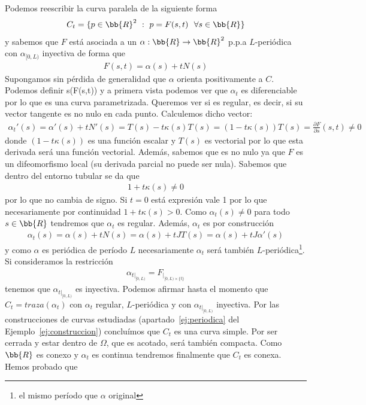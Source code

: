 \begin{ejercicio}
    \begin{solucion}
        Podemos reescribir la curva paralela de la siguiente forma
        \begin{gather*}
            C_t = \{p\in \bb{R}^2 \ : \ p=F(s, t) \ \ \forall s \in \bb{R}\}
        \end{gather*}
        y sabemos que $F$ está asociada a un $\alpha:\bb{R} \to \bb{R}^2$ p.p.a $L$-periódica con $\alpha_{[0,L)}$ inyectiva de forma que 
        \begin{gather*}
            F(s,t) = \alpha(s) + tN(s)
        \end{gather*}
        Supongamos sin pérdida de generalidad que $\alpha$ orienta positivamente a $C$. Podemos definir
             {s}{(F(s,t))}
        y a primera vista podemos ver que $\alpha_t$ es diferenciable por lo que es una curva parametrizada. Queremos ver si es regular, es decir, si su vector tangente es no nulo en cada punto. Calculemos dicho vector:
        \begin{gather*}
            \alpha_t'(s) = \alpha'(s) + tN'(s) = T(s) - t\kappa(s)T(s) = (1-t\kappa(s)) T(s) = \frac{\partial F}{\partial s}(s,t) \neq 0
        \end{gather*}
        donde $(1-t\kappa(s))$ es una función escalar y $T(s)$ es vectorial por lo que esta derivada será una función vectorial. Además, sabemos que es no nulo ya que $F$ es un difeomorfismo local (su derivada parcial no puede ser nula). Sabemos que dentro del entorno tubular se da que 
        \begin{gather*}
            1+ t \kappa(s) \neq 0
        \end{gather*}
        por lo que no cambia de signo. Si $t=0$ está expresión vale 1 por lo que necesariamente por continuidad $1 +t\kappa(s) > 0$. Como $\alpha_t(s) \neq 0$ para todo $s\in \bb{R}$ tendremos que $\alpha_t$ es regular. Además, $\alpha_t$ es por construcción 
        \begin{gather*}
            \alpha_t(s) = \alpha(s) + tN(s) = \alpha(s) + tJ T(s) = \alpha(s) + tJ\alpha'(s)
        \end{gather*}
        y como $\alpha$ es periódica de período $L$ necesariamente $\alpha_t$ será también $L$-periódica\footnote{el mismo período que $\alpha$ original}. Si consideramos la restricción
        \begin{gather*}
            \alpha_{t|_{[0,L)}} = F_{|_{[0,L)\times \{t\}}}
        \end{gather*}
        tenemos que $\alpha_{t|_{[0,L)}}$ es inyectiva. Podemos afirmar hasta el momento que $C_t=traza(\alpha_t)$ con $\alpha_t$ regular, $L$-periódica y con $\alpha_{t|_{[0,L)}}$ inyectiva. Por las construcciones de curvas estudiadas (apartado~\ref{ej:periodica} del Ejemplo~\ref{ej:construccion}) concluímos que $C_t$ es una curva simple. Por ser cerrada y estar dentro de $\Omega$, que es acotado, será también compacta. Como $\bb{R}$ es conexo y $\alpha_t$ es continua tendremos finalmente que $C_t$ es conexa. Hemos probado que 

\end{solucion}
\end{ejercicio}
